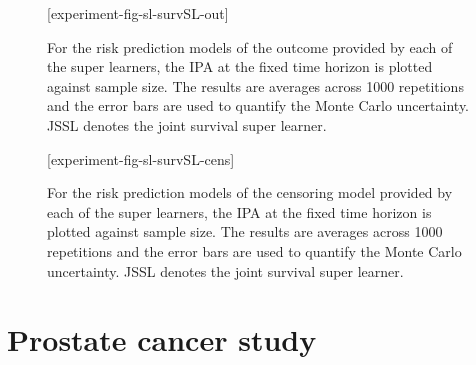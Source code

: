 \documentclass[lineno]{biometrika}
\newcommand{\1}{\mathds{1}}
\providecommand{\DIFaddend}{} %
\begin{document}
\DIFaddend \begin{figure}
\figurebox{20pc}{25pc}{}[experiment-fig-sl-survSL-out]
\caption{For the risk prediction models of the outcome provided by
  each of the super learners, the IPA at the fixed time horizon is
  plotted against sample size. The results are averages across 1000
  repetitions and the error bars are used to quantify the Monte Carlo
  uncertainty. JSSL denotes the joint survival super learner.}
\label{fig:zelefski-out}
\end{figure}

\begin{figure}
\figurebox{20pc}{25pc}{}[experiment-fig-sl-survSL-cens]
\caption{For the risk prediction models of the censoring model
    provided by each of the super learners, the IPA at the fixed time
    horizon is plotted against sample size. The results are averages
    across 1000 repetitions and the error bars are used to quantify
    the Monte Carlo uncertainty. JSSL denotes the joint survival super
    learner.}
\label{fig:zelefski-cens}
\end{figure}


\section{Prostate cancer study}
\label{sec:real-data-appl}
\end{document}

